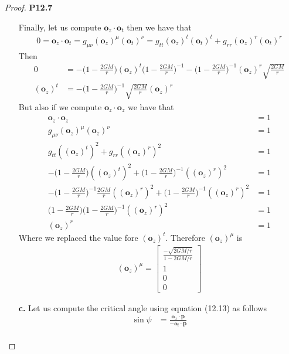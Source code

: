 \documentclass[11pt]{article}
\theoremstyle{definition}
\begin{document}
\begin{proof}{\textbf{P12.7}}
\begin{itemize}
    Finally, let us compute $\bm{o}_z \cdot \bm{o}_t$ then we have that
    \begin{align*}
        0 = \bm{o}_z \cdot \bm{o}_t
        = g_{\mu\nu} (\bm{o}_z)^\mu(\bm{o}_t)^\nu
        = g_{tt} (\bm{o}_z)^t(\bm{o}_t)^t
        + g_{rr} (\bm{o}_z)^r(\bm{o}_t)^r
    \end{align*}
    Then 
    \begin{align*}
        0 &= -\bigg(1 - \frac{2GM}{r}\bigg) (\bm{o}_z)^t \bigg(1 - \frac{2GM}{r}\bigg)^{-1}
        - \bigg(1 - \frac{2GM}{r}\bigg)^{-1} (\bm{o}_z)^r \sqrt{\frac{2GM}{r}}\\
        (\bm{o}_z)^t &=
        - \bigg(1 - \frac{2GM}{r}\bigg)^{-1}\sqrt{\frac{2GM}{r}}(\bm{o}_z)^r
    \end{align*}
    But also if we compute $\bm{o}_z \cdot \bm{o}_z$ we have that
    \begin{align*}
        \bm{o}_z \cdot \bm{o}_z &= 1\\
        g_{\mu\nu} (\bm{o}_z)^\mu(\bm{o}_z)^\nu &= 1\\
        g_{tt} ((\bm{o}_z)^t)^2 + g_{rr} ((\bm{o}_z)^r)^2 &= 1\\
        -\bigg(1 - \frac{2GM}{r}\bigg)((\bm{o}_z)^t)^2
        + \bigg(1 - \frac{2GM}{r}\bigg)^{-1} ((\bm{o}_z)^r)^2 &= 1\\
        -\bigg(1 - \frac{2GM}{r}\bigg)^{-1}\frac{2GM}{r}((\bm{o}_z)^r)^2
        + \bigg(1 - \frac{2GM}{r}\bigg)^{-1} ((\bm{o}_z)^r)^2 &= 1\\
        \bigg(1 -\frac{2GM}{r}\bigg)
        \bigg(1 - \frac{2GM}{r}\bigg)^{-1} ((\bm{o}_z)^r)^2 &= 1\\
        (\bm{o}_z)^r &= 1
    \end{align*}
    Where we replaced the value fore $(\bm{o}_z)^t$. Therefore $(\bm{o}_z)^\mu$
    is
    \begin{align*}
        (\bm{o}_z)^\mu = \begin{bmatrix}
            \frac{-\sqrt{2GM/r}}{1 - 2GM/r}\\
            1 \\ 0 \\ 0
        \end{bmatrix}
    \end{align*}
    \item [\textbf{c.}] Let us compute the critical angle using equation
    (12.13) as follows
    \begin{align*}
        \sin\psi &= \frac{\bm{o}_x\cdot \bm{p}}{-\bm{o}_t\cdot \bm{p}}\\

\end{align*}
\end{itemize}
\end{proof}
\end{document}
